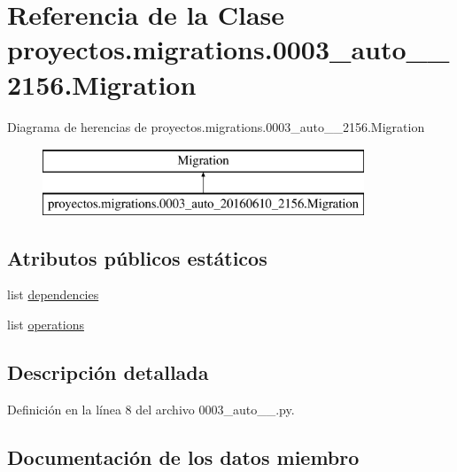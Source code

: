 \hypertarget{classproyectos_1_1migrations_1_10003__auto__20160610__2156_1_1_migration}{}\section{Referencia de la Clase proyectos.\+migrations.0003\+\_\+auto\+\_\+\_\+2156.Migration}
\label{classproyectos_1_1migrations_1_10003__auto__20160610__2156_1_1_migration}
Diagrama de herencias de proyectos.\+migrations.0003\+\_\+auto\+\_\+\_\+2156.Migration\begin{figure}[H]
\begin{center}
\leavevmode
\includegraphics[height=2.000000cm]{classproyectos_1_1migrations_1_10003__auto__20160610__2156_1_1_migration}
\end{center}
\end{figure}
\subsection*{Atributos públicos estáticos}
\begin{DoxyCompactItemize}
\item 
list \hyperlink{classproyectos_1_1migrations_1_10003__auto__20160610__2156_1_1_migration_a54929c8ad0072412347e659d22d01064}{dependencies}
\item 
list \hyperlink{classproyectos_1_1migrations_1_10003__auto__20160610__2156_1_1_migration_a0513659b472cdc7254fe2a7231c1afab}{operations}
\end{DoxyCompactItemize}


\subsection{Descripción detallada}


Definición en la línea 8 del archivo 0003\+\_\+auto\+\_\+\_.\+py.



\subsection{Documentación de los datos miembro}
